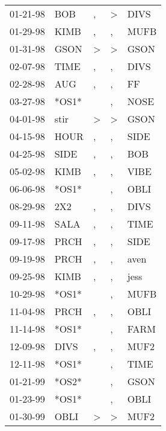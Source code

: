 \begin{supertabular}{lllll}
 01-21-98 &    BOB &                , &  \textgreater &   DIVS \\
 01-29-98 &   KIMB &                , &             , &   MUFB \\
 01-31-98 &   GSON &     \textgreater &  \textgreater &   GSON \\
 02-07-98 &   TIME &                , &             , &   DIVS \\
 02-28-98 &    AUG &                , &             , &     FF \\
 03-27-98 &  *OS1* &                  &             , &   NOSE \\
 04-01-98 &   stir &     \textgreater &  \textgreater &   GSON \\
 04-15-98 &   HOUR &                , &             , &   SIDE \\
 04-25-98 &   SIDE &                , &             , &    BOB \\
 05-02-98 &   KIMB &                , &             , &   VIBE \\
 06-06-98 &  *OS1* &                  &             , &   OBLI \\
 08-29-98 &    2X2 &                , &             , &   DIVS \\
 09-11-98 &   SALA &                , &             , &   TIME \\
 09-17-98 &   PRCH &                , &             , &   SIDE \\
 09-19-98 &   PRCH &                , &             , &   aven \\
 09-25-98 &   KIMB &                , &             , &   jess \\
 10-29-98 &  *OS1* &                  &             , &   MUFB \\
 11-04-98 &   PRCH &                , &             , &   OBLI \\
 11-14-98 &  *OS1* &                  &             , &   FARM \\
 12-09-98 &   DIVS &                , &             , &   MUF2 \\
 12-11-98 &  *OS1* &                  &             , &   TIME \\
 01-21-99 &  *OS2* &                  &             , &   GSON \\
 01-23-99 &  *OS1* &                  &             , &   OBLI \\
 01-30-99 &   OBLI &     \textgreater &  \textgreater &   MUF2 \\

\end{supertabular}

